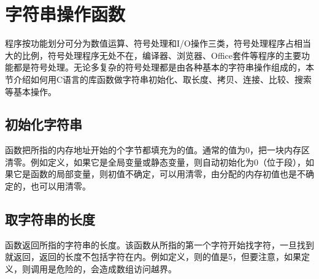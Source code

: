 


\section{字符串操作函数}
%
程序按功能划分可分为数值运算、符号处理和I/\BookSplit{}O操作三类，符号处理程序占相当大的比例，符号处理程序无处不在，编译器、浏览器、Office套件等程序的主要功能都是符号处理。无论多复杂的符号处理都是由各种基本的字符串操作组成的，本节介绍如何用C语言的库函数做字符串初始化、取长度、拷贝、连接、比较、搜索等基本操作。


\subsection{初始化字符串}
%



函数把所指的内存地址开始的个字节都填充为的值。通常的值为0，把一块内存区清零。例如定义，如果它是全局变量或静态变量，则自动初始化为0（位于段），如果它是函数的局部变量，则初值不确定，可以用清零，由分配的内存初值也是不确定的，也可以用清零。


\subsection{取字符串的长度}
%



函数返回所指的字符串的长度。该函数从所指的第一个字符开始找字符，一旦找到就返回，返回的长度不包括字符在内。例如定义，则的值是5，但要注意，如果定义，则调用是危险的，会造成数组访问越界。


